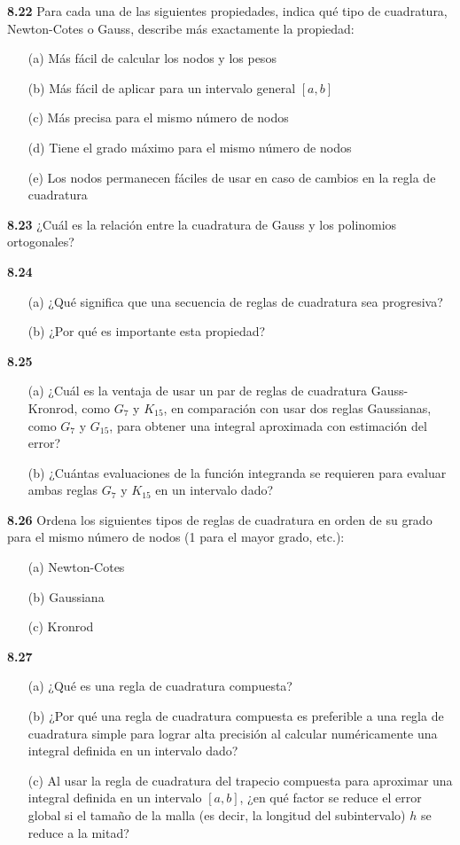 \documentclass{article}
\begin{document}
\begin{itemize}
\textbf{8.22} Para cada una de las siguientes propiedades, indica qué tipo de cuadratura, Newton-Cotes o Gauss, describe más exactamente la propiedad:
\begin{itemize}
    \item[(a)] Más fácil de calcular los nodos y los pesos
    \item[(b)] Más fácil de aplicar para un intervalo general \([a, b]\)
    \item[(c)] Más precisa para el mismo número de nodos
    \item[(d)] Tiene el grado máximo para el mismo número de nodos
    \item[(e)] Los nodos permanecen fáciles de usar en caso de cambios en la regla de cuadratura
\end{itemize}

\textbf{8.23} ¿Cuál es la relación entre la cuadratura de Gauss y los polinomios ortogonales?
\end{itemize}


\textbf{8.24}
\begin{itemize}
    \item[(a)] ¿Qué significa que una secuencia de reglas de cuadratura sea progresiva?
    \item[(b)] ¿Por qué es importante esta propiedad?
\end{itemize}

\textbf{8.25}
\begin{itemize}
    \item[(a)] ¿Cuál es la ventaja de usar un par de reglas de cuadratura Gauss-Kronrod, como \(G_7\) y \(K_{15}\), en comparación con usar dos reglas Gaussianas, como \(G_7\) y \(G_{15}\), para obtener una integral aproximada con estimación del error?
    \item[(b)] ¿Cuántas evaluaciones de la función integranda se requieren para evaluar ambas reglas \(G_7\) y \(K_{15}\) en un intervalo dado?
\end{itemize}

\textbf{8.26} Ordena los siguientes tipos de reglas de cuadratura en orden de su grado para el mismo número de nodos (1 para el mayor grado, etc.):
\begin{itemize}
    \item[(a)] Newton-Cotes
    \item[(b)] Gaussiana
    \item[(c)] Kronrod
\end{itemize}

\textbf{8.27}
\begin{itemize}
    \item[(a)] ¿Qué es una regla de cuadratura compuesta?
    \item[(b)] ¿Por qué una regla de cuadratura compuesta es preferible a una regla de cuadratura simple para lograr alta precisión al calcular numéricamente una integral definida en un intervalo dado?
    \item[(c)] Al usar la regla de cuadratura del trapecio compuesta para aproximar una integral definida en un intervalo \([a, b]\), ¿en qué factor se reduce el error global si el tamaño de la malla (es decir, la longitud del subintervalo) \(h\) se reduce a la mitad?
\end{itemize}
\end{document}
